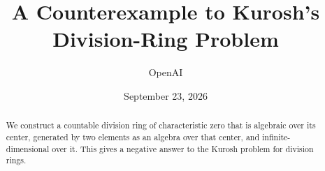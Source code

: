 \documentclass[11pt]{article}
\title{A Counterexample to Kurosh's Division-Ring Problem}
\author{OpenAI}
\date{September 23, 2026}
\begin{document}
\maketitle
\begin{abstract}
We construct a countable division ring of characteristic zero that is
algebraic over its center, generated by two elements as an algebra over
that center, and infinite-dimensional over it. This gives a negative
answer to the Kurosh problem for division rings.
\end{abstract}
\setcounter{tocdepth}{1}
\tableofcontents
\clearpage














\end{document}
